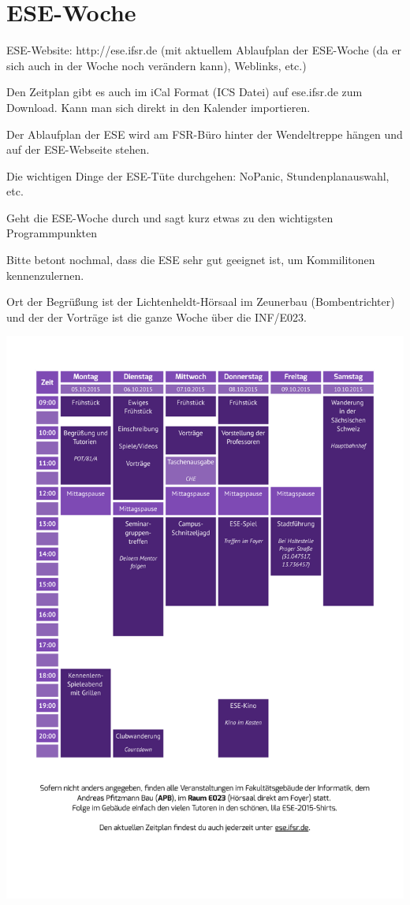 \documentclass[a4paper,12pt]{report}
\begin{document}
\section{ESE-Woche}
\begin{itemize*}
\item ESE-Website: http://ese.ifsr.de (mit aktuellem Ablaufplan der ESE-Woche (da er sich auch in der Woche noch verändern kann), Weblinks, etc.)
\item Den Zeitplan gibt es auch im iCal Format (ICS Datei) auf ese.ifsr.de zum Download.
Kann man sich direkt in den Kalender importieren.
\item Der Ablaufplan der ESE wird am FSR-Büro hinter der Wendeltreppe hängen und auf der ESE-Webseite stehen.
\item Die wichtigen Dinge der ESE-Tüte durchgehen: NoPanic, Stundenplanauswahl, etc.
\item Geht die ESE-Woche durch und sagt kurz etwas zu den wichtigsten Programmpunkten
\item Bitte betont nochmal, dass die ESE sehr gut geeignet ist, um Kommilitonen kennenzulernen.
\end{itemize*}
\vspace{0.5cm}
Ort der Begrüßung ist der Lichtenheldt-Hörsaal im Zeunerbau (Bombentrichter) und der der Vorträge ist die ganze Woche über die INF/E023.

\includegraphics[width=\linewidth]{./zeitplan_2015.pdf}
\end{document}
